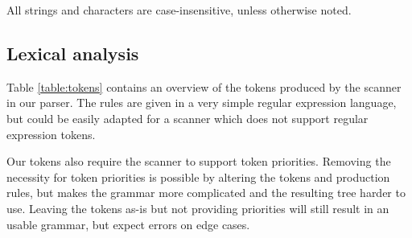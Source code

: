 \documentclass[conference]{IEEEtran}
\begin{document}
All strings and characters are case-insensitive, unless otherwise noted.

\subsection{Lexical analysis}

Table \ref{table:tokens} contains an overview of the tokens produced by the scanner in our parser. The rules are given in a very simple regular expression language, but could be easily adapted for a scanner which does not support regular expression tokens. 

Our tokens also require the scanner to support token priorities. Removing the necessity for token priorities is possible by altering the tokens and production rules, but makes the grammar more complicated and the resulting tree harder to use. Leaving the tokens as-is but not providing priorities will still result in an usable grammar, but expect errors on edge cases.
\end{document}
